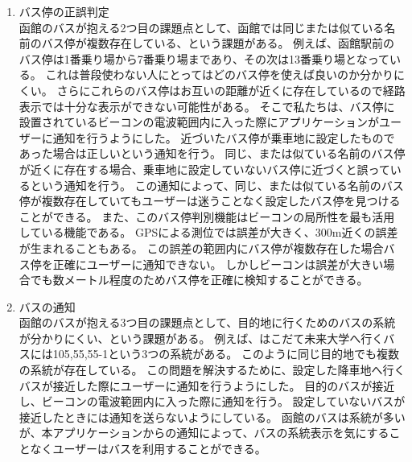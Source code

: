\documentclass[openany,11pt,papersize]{jsbook}
\begin{document}
\begin{enumerate}
\item バス停の正誤判定\mbox{}\\
函館のバスが抱える2つ目の課題点として、函館では同じまたは似ている名前のバス停が複数存在している、という課題がある。
例えば、函館駅前のバス停は1番乗り場から7番乗り場まであり、その次は13番乗り場となっている。
これは普段使わない人にとってはどのバス停を使えば良いのか分かりにくい。
さらにこれらのバス停はお互いの距離が近くに存在しているので経路表示では十分な表示ができない可能性がある。
そこで私たちは、バス停に設置されているビーコンの電波範囲内に入った際にアプリケーションがユーザーに通知を行うようにした。
近づいたバス停が乗車地に設定したものであった場合は正しいという通知を行う。
同じ、または似ている名前のバス停が近くに存在する場合、乗車地に設定していないバス停に近づくと誤っているという通知を行う。
この通知によって、同じ、または似ている名前のバス停が複数存在していてもユーザーは迷うことなく設定したバス停を見つけることができる。
また、このバス停判別機能はビーコンの局所性を最も活用している機能である。
GPSによる測位では誤差が大きく、300m近くの誤差が生まれることもある。
この誤差の範囲内にバス停が複数存在した場合バス停を正確にユーザーに通知できない。
しかしビーコンは誤差が大きい場合でも数メートル程度のためバス停を正確に検知することができる。

\item バスの通知\mbox{}\\
函館のバスが抱える3つ目の課題点として、目的地に行くためのバスの系統が分かりにくい、という課題がある。
例えば、はこだて未来大学へ行くバスには105,55,55-1という3つの系統がある。
このように同じ目的地でも複数の系統が存在している。
この問題を解決するために、設定した降車地へ行くバスが接近した際にユーザーに通知を行うようにした。
目的のバスが接近し、ビーコンの電波範囲内に入った際に通知を行う。
設定していないバスが接近したときには通知を送らないようにしている。
函館のバスは系統が多いが、本アプリケーションからの通知によって、バスの系統表示を気にすることなくユーザーはバスを利用することができる。

\end{enumerate}

\end{document}
